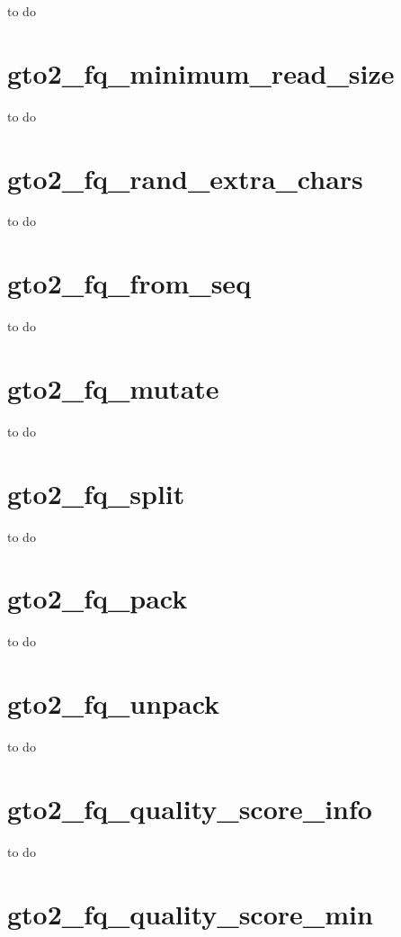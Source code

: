 \documentclass[11pt,]{krantz}
\begin{document}
to do

\section{gto2\_fq\_minimum\_read\_size}\label{gto2_fq_minimum_read_size}

to do

\section{gto2\_fq\_rand\_extra\_chars}\label{gto2_fq_rand_extra_chars}

to do

\section{gto2\_fq\_from\_seq}\label{gto2_fq_from_seq}

to do

\section{gto2\_fq\_mutate}\label{gto2_fq_mutate}

to do

\section{gto2\_fq\_split}\label{gto2_fq_split}

to do

\section{gto2\_fq\_pack}\label{gto2_fq_pack}

to do

\section{gto2\_fq\_unpack}\label{gto2_fq_unpack}

to do

\section{gto2\_fq\_quality\_score\_info}\label{gto2_fq_quality_score_info}

to do

\section{gto2\_fq\_quality\_score\_min}\label{gto2_fq_quality_score_min}
\end{document}
